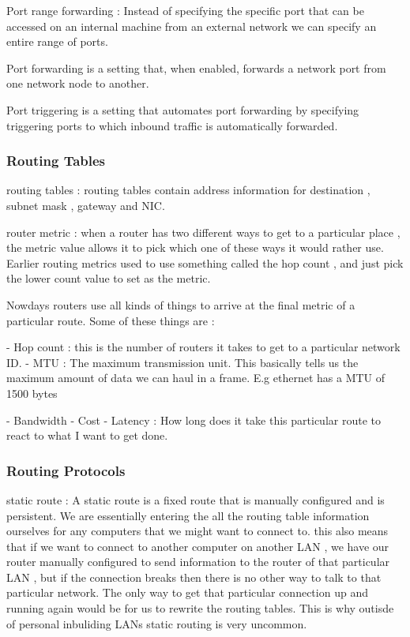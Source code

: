 Port range forwarding : Instead of specifying the specific port that can be
accessed on an internal machine from an external network we can specify an
entire range of ports.

Port forwarding is a setting that, when enabled, forwards a network port from
one network node to another.

Port triggering is a setting that automates port forwarding by specifying
triggering ports to which inbound traffic is automatically forwarded.


\subsubsectionend

\subsubsection{Routing Tables}
\label{sssec:routing_tables}

routing tables : routing tables contain address information for destination ,
subnet mask , gateway and NIC.

router metric : when a router has two different ways to get to a particular
place , the metric value allows it to pick which one of these ways it would
rather use. Earlier routing metrics used to use something called the hop count ,
and just pick the lower count value to set as the metric.


Nowdays routers use all kinds of things to arrive at the final metric of a
particular route. Some of these things are :

 - Hop count : this is the number of routers it takes to get to a particular
network ID.
 - MTU : The maximum transmission unit. This basically tells us the maximum amount
of data we can haul in a frame. E.g ethernet has a MTU of 1500 bytes

 - Bandwidth
 - Cost
 - Latency : How long does it take this particular route to react to what I want
 to get done.


\subsubsectionend

\subsubsection{Routing Protocols}
\label{sssec:routing_protocols}

static route : A static route is a fixed route that is manually configured and
is persistent. We are essentially entering the all the routing table information
ourselves for any computers that we might want to connect to. this also means
that if we want to connect to another computer on another LAN , we have our
router manually configured to send information to the router of that particular
LAN , but if the connection breaks then there is no other way to talk to that
particular network. The only way to get that particular connection up and
running again would be for us to rewrite the routing tables. This is why outisde
of personal inbuliding LANs static routing is very uncommon.

